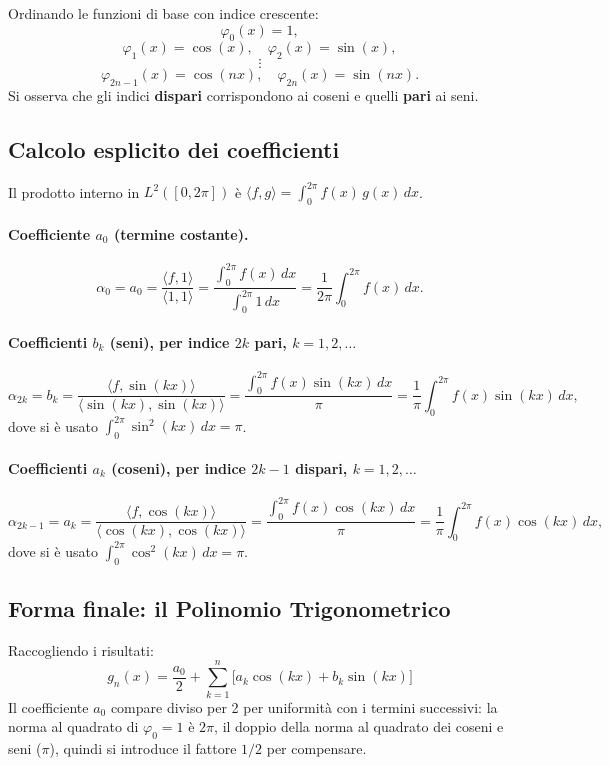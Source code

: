 \documentclass[a4paper,12pt]{article}
\theoremstyle{definition}
\theoremstyle{remark}
\begin{document}
Ordinando le funzioni di base con indice crescente:
\[
  \varphi_0(x) = 1,
\]
\[
  \varphi_1(x) = \cos(x), \quad \varphi_2(x) = \sin(x),
\]
\[
  \vdots
\]
\[
  \varphi_{2n-1}(x) = \cos(nx), \quad \varphi_{2n}(x) = \sin(nx).
\]
Si osserva che gli indici \textbf{dispari} corrispondono ai coseni e quelli
\textbf{pari} ai seni.

\subsection{Calcolo esplicito dei coefficienti}

Il prodotto interno in $L^2([0, 2\pi])$ è
$\langle f, g \rangle = \int_0^{2\pi} f(x)\,g(x)\,dx$.

\paragraph{Coefficiente $a_0$ (termine costante).}
\[
  \alpha_0 = a_0
    = \frac{\langle f, 1 \rangle}{\langle 1, 1 \rangle}
    = \frac{\displaystyle\int_0^{2\pi} f(x)\,dx}{\displaystyle\int_0^{2\pi} 1\,dx}
    = \frac{1}{2\pi}\int_0^{2\pi} f(x)\,dx.
\]

\paragraph{Coefficienti $b_k$ (seni), per indice $2k$ pari, $k = 1, 2, \ldots$}
\[
  \alpha_{2k} = b_k
    = \frac{\langle f, \sin(kx) \rangle}{\langle \sin(kx), \sin(kx) \rangle}
    = \frac{\displaystyle\int_0^{2\pi} f(x)\sin(kx)\,dx}{\pi}
    = \frac{1}{\pi}\int_0^{2\pi} f(x)\sin(kx)\,dx,
\]
dove si è usato $\int_0^{2\pi}\sin^2(kx)\,dx = \pi$.

\paragraph{Coefficienti $a_k$ (coseni), per indice $2k-1$ dispari, $k = 1, 2, \ldots$}
\[
  \alpha_{2k-1} = a_k
    = \frac{\langle f, \cos(kx) \rangle}{\langle \cos(kx), \cos(kx) \rangle}
    = \frac{\displaystyle\int_0^{2\pi} f(x)\cos(kx)\,dx}{\pi}
    = \frac{1}{\pi}\int_0^{2\pi} f(x)\cos(kx)\,dx,
\]
dove si è usato $\int_0^{2\pi}\cos^2(kx)\,dx = \pi$.

\subsection{Forma finale: il Polinomio Trigonometrico}

Raccogliendo i risultati:
\begin{equation}
  \boxed{
    g_n(x) = \frac{a_0}{2} + \sum_{k=1}^{n}\bigl[a_k\cos(kx) + b_k\sin(kx)\bigr]
  }
\end{equation}
Il coefficiente $a_0$ compare diviso per 2 per uniformità con i termini successivi:
la norma al quadrato di $\varphi_0 = 1$ è $2\pi$, il doppio della norma al quadrato
dei coseni e seni ($\pi$), quindi si introduce il fattore $1/2$ per compensare.
\end{document}
